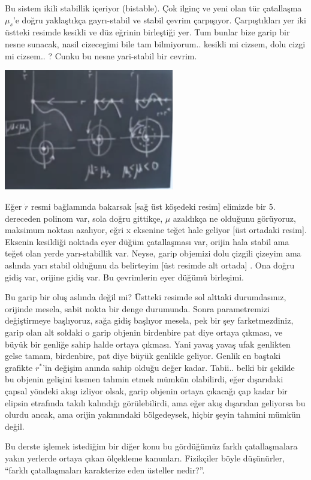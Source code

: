 \documentclass[12pt,fleqn]{article}\usepackage{../../common}
\begin{document}
Bu sistem ikili stabillik içeriyor (bistable). Çok ilginç ve yeni olan tür
çatallaşma $\mu_s$'e doğru yaklaştıkça gayrı-stabil ve stabil çevrim
çarpışıyor. Çarpıştıkları yer iki üstteki resimde kesikli ve düz eğrinin
birleştiği yer. Tum bunlar bize garip bir nesne sunacak, nasil cizecegimi
bile tam bilmiyorum.. kesikli mi cizsem, dolu cizgi mi cizsem.. ? Cunku bu
nesne yari-stabil bir cevrim. 

\includegraphics[width=20em]{14_06.png}

Eğer $\dot{r}$ resmi bağlamında bakarsak [sağ üst köşedeki resim] elimizde
bir 5. dereceden polinom var, sola doğru gittikçe, $\mu$ azaldıkça ne
olduğunu görüyoruz, maksimum noktası azalıyor, eğri x eksenine teğet hale
geliyor [üst ortadaki resim]. Eksenin kesildiği noktada eyer düğüm
çatallaşması var, orijin hala stabil ama teğet olan yerde yarı-stabillik
var. Neyse, garip objemizi dolu çizgili çizeyim ama aslında yarı stabil
olduğunu da belirteyim [üst resimde alt ortada] . Ona doğru gidiş var,
orijine gidiş var. Bu çevrimlerin eyer düğümü birleşimi. 

Bu garip bir oluş aslında değil mi? Üstteki resimde sol alttaki
durumdasınız, orijinde mesela, sabit nokta bir denge durumunda. Sonra
parametremizi değiştirmeye başlıyoruz, sağa gidiş başlıyor mesela, pek bir
şey farketmezdiniz, garip olan alt soldaki o garip objenin birdenbire pat
diye ortaya çıkması, ve büyük bir genliğe sahip halde ortaya çıkması. Yani
yavaş yavaş ufak genlikten gelse tamam, birdenbire, pat diye büyük genlikle
geliyor. Genlik en baştaki grafikte $r^\ast$'in değişim anında sahip olduğu
değer kadar. Tabii.. belki bir şekilde bu objenin gelişini kısmen tahmin
etmek mümkün olabilirdi, eğer dışarıdaki çapsal yöndeki akışı izliyor
olsak, garip objenin ortaya çıkacağı çap kadar bir elipsin etrafında takılı
kalındığı görülebilirdi, ama eğer akış dışarıdan geliyorsa bu olurdu ancak,
ama orijin yakınındaki bölgedeysek, hiçbir şeyin tahmini mümkün değil.

Bu derste işlemek istediğim bir diğer konu bu gördüğümüz farklı
çatallaşmalara yakın yerlerde ortaya çıkan ölçekleme kanunları. Fizikçiler
böyle düşünürler, ``farklı çatallaşmaları karakterize eden üsteller
nedir?''. 
\end{document}
